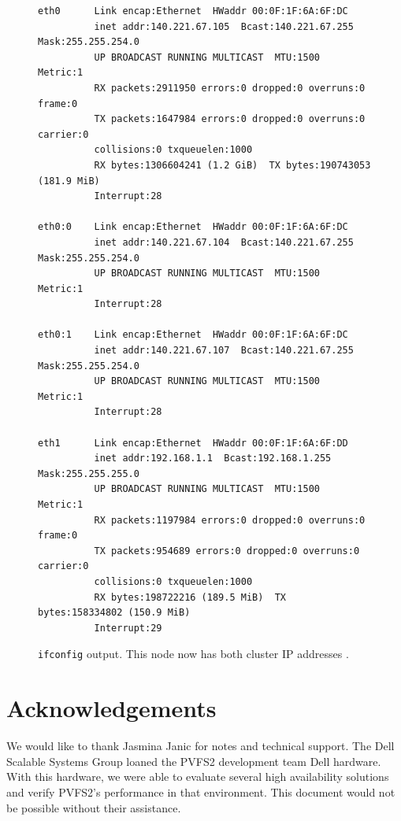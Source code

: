 \documentclass[11pt]{article}
\begin{document}
\begin{figure}
\begin{scriptsize}
\begin{verbatim}
eth0      Link encap:Ethernet  HWaddr 00:0F:1F:6A:6F:DC  
          inet addr:140.221.67.105  Bcast:140.221.67.255  Mask:255.255.254.0
          UP BROADCAST RUNNING MULTICAST  MTU:1500  Metric:1
          RX packets:2911950 errors:0 dropped:0 overruns:0 frame:0
          TX packets:1647984 errors:0 dropped:0 overruns:0 carrier:0
          collisions:0 txqueuelen:1000 
          RX bytes:1306604241 (1.2 GiB)  TX bytes:190743053 (181.9 MiB)
          Interrupt:28 

eth0:0    Link encap:Ethernet  HWaddr 00:0F:1F:6A:6F:DC  
          inet addr:140.221.67.104  Bcast:140.221.67.255  Mask:255.255.254.0
          UP BROADCAST RUNNING MULTICAST  MTU:1500  Metric:1
          Interrupt:28 

eth0:1    Link encap:Ethernet  HWaddr 00:0F:1F:6A:6F:DC  
          inet addr:140.221.67.107  Bcast:140.221.67.255  Mask:255.255.254.0
          UP BROADCAST RUNNING MULTICAST  MTU:1500  Metric:1
          Interrupt:28 

eth1      Link encap:Ethernet  HWaddr 00:0F:1F:6A:6F:DD  
          inet addr:192.168.1.1  Bcast:192.168.1.255  Mask:255.255.255.0
          UP BROADCAST RUNNING MULTICAST  MTU:1500  Metric:1
          RX packets:1197984 errors:0 dropped:0 overruns:0 frame:0
          TX packets:954689 errors:0 dropped:0 overruns:0 carrier:0
          collisions:0 txqueuelen:1000 
          RX bytes:198722216 (189.5 MiB)  TX bytes:158334802 (150.9 MiB)
          Interrupt:29 
\end{verbatim}
\end{scriptsize}
\caption{\texttt{ifconfig} output.  This node now has both cluster IP
addresses .}
\label{fig:ifconfig-aa}
\end{figure}

\section{Acknowledgements}
We would like to thank Jasmina Janic for notes and technical support.
The Dell Scalable Systems Group loaned the PVFS2 development team Dell
hardware.  With this hardware, we were able to evaluate several high
availability solutions and verify PVFS2's performance in that
environment.  This document would not be possible without their
assistance.
\end{document}
